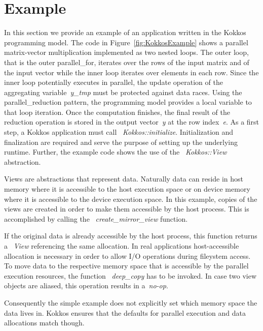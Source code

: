 \section{Example}\label{chap:kokkosExample}

In this section we provide an example of an application written in the Kokkos programming model. The code in Figure~\ref{fig:KokkosExample} shows a parallel matrix-vector multiplication implemented as two nested loops. The outer loop, that is the outer parallel_for, iterates over the rows of the input matrix and of the input vector while the inner loop iterates over elements in each row. Since the inner loop potentially executes in parallel, the update operation of the aggregating variable~\emph{y_tmp} must be protected against data races. Using the parallel_reduction pattern, the programming model provides a local variable to that loop iteration. Once the computation finishes, the final result of the reduction operation is stored in the output vector~\emph{y} at the row index~\emph{e}.  
As a first step, a Kokkos application must call ~\emph{Kokkos::initialize}. Initialization and finalization are required and serve the purpose of setting up the underlying runtime. 
Further, the example code shows the use of the ~\emph{Kokkos::View} abstraction. 

Views are abstractions that represent data. Naturally data can reside in host memory where it is accessible to the host execution space or on device memory where it is accessible to the device execution space. In this example, copies of the views are created in order to make them accessible by the host process. This is accomplished by calling the ~\emph{create\_mirror\_view} function. 

If the original data is already accessible by the host process, this function returns a ~\emph{View} referencing the same allocation. In real applications host-accessible allocation is necessary in order to allow I/O operations during fileystem access. To move data to the respective memory space that is accessible by the parallel execution resources, the function ~\emph{deep\_copy} has to be invoked. In case two view objects are aliased, this operation results in a~\emph{no-op}. 

Consequently the simple example does not explicitly set which memory space the data lives in.
Kokkos ensures that the defaults for parallel execution and data allocations match though. 

